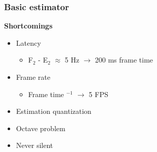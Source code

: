 \documentclass[table]{beamer}
\newcommand{\notee}[2]{#1${}_{#2}$}
\begin{document}
\begin{frame}
\frametitle{Basic estimator}
    {\large \textbf{Shortcomings}}
    \begin{itemize}
        \item Latency
        \begin{itemize}
            \item[{\LARGE \rotatebox[origin=c]{180}{$\Lsh$}}] \notee{F}{2} - \notee{E}{2} $\approx$ 5 Hz $\rightarrow$ 200 ms frame time
        \end{itemize}
        \item Frame rate
        \begin{itemize}
            \item[{\LARGE \rotatebox[origin=c]{180}{$\Lsh$}}] Frame time ${\!}^{-1}$ $\rightarrow$ 5 FPS
        \end{itemize}
        \item Estimation quantization
        \item Octave problem
        \item Never silent

    \end{itemize}
\end{frame}
\end{document}

